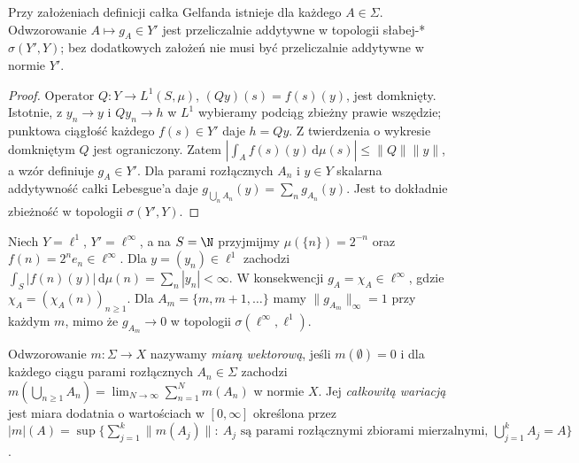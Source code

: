 \begin{twierdzenie}
\label{thm:gelfand-exists15b}
Przy założeniach definicji całka Gelfanda istnieje dla
każdego $A\in\Sigma$. Odwzorowanie
$A\mapsto g_A\in Y'$ jest przeliczalnie addytywne
w topologii słabej-* $\sigma(Y',Y)$; bez dodatkowych
założeń nie musi być przeliczalnie addytywne w normie $Y'$.
\end{twierdzenie}
\begin{proof}
Operator $Q:Y\to L^1(S,\mu)$, $(Qy)(s)=f(s)(y)$,
jest domknięty. Istotnie, z $y_n\to y$ i $Qy_n\to h$
w $L^1$ wybieramy podciąg zbieżny prawie wszędzie;
punktowa ciągłość każdego $f(s)\in Y'$ daje $h=Qy$.
Z twierdzenia o wykresie domkniętym $Q$ jest ograniczony.
Zatem $|\int_Af(s)(y)\,\mathrm d\mu(s)|\le\|Q\|\|y\|$,
a wzór definiuje $g_A\in Y'$.
Dla parami rozłącznych $A_n$ i $y\in Y$ skalarna
addytywność całki Lebesgue'a daje
$g_{\bigcup_nA_n}(y)=\sum_ng_{A_n}(y)$.
Jest to dokładnie zbieżność w topologii $\sigma(Y',Y)$.
\end{proof}

\begin{przyklad}
\label{ex:gelfand-weakstar15b}
Niech $Y=\ell^1$, $Y'=\ell^\infty$, a na $S=\N$ przyjmijmy
$\mu(\{n\})=2^{-n}$ oraz $f(n)=2^ne_n\in\ell^\infty$.
Dla $y=(y_n)\in\ell^1$ zachodzi
$\int_S|f(n)(y)|\,\mathrm d\mu(n)=\sum_n|y_n|<\infty$.
W konsekwencji $g_A=\chi_A\in\ell^\infty$, gdzie
$\chi_A=(\chi_A(n))_{n\ge1}$. Dla $A_m=\{m,m+1,\ldots\}$
mamy $\|g_{A_m}\|_\infty=1$ przy każdym $m$, mimo że
$g_{A_m}\to0$ w topologii $\sigma(\ell^\infty,\ell^1)$.
\end{przyklad}

\begin{definicja}
\label{def:vector-measure15b}
Odwzorowanie $m:\Sigma\to X$ nazywamy \emph{miarą wektorową},
jeśli $m(\emptyset)=0$ i dla każdego ciągu parami rozłącznych
$A_n\in\Sigma$ zachodzi
$m(\bigcup_{n\ge1}A_n)=\lim_{N\to\infty}\sum_{n=1}^Nm(A_n)$
w normie $X$. Jej \emph{całkowitą wariacją} jest miara
dodatnia o wartościach w $[0,\infty]$ określona przez
$|m|(A)=\sup\{\sum_{j=1}^k\|m(A_j)\|:\ A_j\text{ są
parami rozłącznymi zbiorami mierzalnymi, }
\bigcup_{j=1}^kA_j=A\}$.
\end{definicja}

